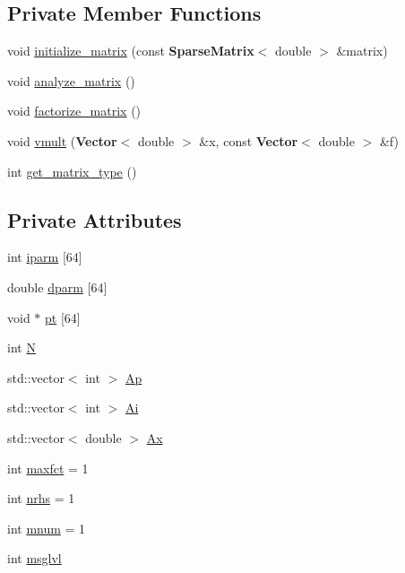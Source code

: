\subsection*{Private Member Functions}
\begin{DoxyCompactItemize}
\item 
void \hyperlink{class_block_solver_wrapper_p_a_r_d_i_s_o_a73460ba651207f3b8e86699f58db896f}{initialize\+\_\+matrix} (const {\bf Sparse\+Matrix}$<$ double $>$ \&matrix)
\item 
void \hyperlink{class_block_solver_wrapper_p_a_r_d_i_s_o_a53ca2b0fda79f7c29ab46b32469d058a}{analyze\+\_\+matrix} ()
\item 
void \hyperlink{class_block_solver_wrapper_p_a_r_d_i_s_o_accbe586b87cfd3d453522fee240ff37b}{factorize\+\_\+matrix} ()
\item 
void \hyperlink{class_block_solver_wrapper_p_a_r_d_i_s_o_a1dfbc3e43736a1225caa0ab91a30b80e}{vmult} ({\bf Vector}$<$ double $>$ \&x, const {\bf Vector}$<$ double $>$ \&f)
\item 
int \hyperlink{class_block_solver_wrapper_p_a_r_d_i_s_o_a3ec780cd305a0fe8326a6acb5c9283e9}{get\+\_\+matrix\+\_\+type} ()
\end{DoxyCompactItemize}
\subsection*{Private Attributes}
\begin{DoxyCompactItemize}
\item 
int \hyperlink{class_block_solver_wrapper_p_a_r_d_i_s_o_a61c49eda443075c200c9583f982ca447}{iparm} \mbox{[}64\mbox{]}
\item 
double \hyperlink{class_block_solver_wrapper_p_a_r_d_i_s_o_aa158c35f9486dc043bf3485da3dec8d4}{dparm} \mbox{[}64\mbox{]}
\item 
void $\ast$ \hyperlink{class_block_solver_wrapper_p_a_r_d_i_s_o_a4d1d5d9882ed7b4019b7412b0bbd125c}{pt} \mbox{[}64\mbox{]}
\item 
int \hyperlink{class_block_solver_wrapper_p_a_r_d_i_s_o_a0218d17deabfb2a7b8905b90ccb6ef46}{N}
\item 
std\+::vector$<$ int $>$ \hyperlink{class_block_solver_wrapper_p_a_r_d_i_s_o_ad284b0a41b7e8f6ab2f58308dfad7c13}{Ap}
\item 
std\+::vector$<$ int $>$ \hyperlink{class_block_solver_wrapper_p_a_r_d_i_s_o_a20249115ffb23d1c0d35c22fa76a1257}{Ai}
\item 
std\+::vector$<$ double $>$ \hyperlink{class_block_solver_wrapper_p_a_r_d_i_s_o_ad32493c27639c20286aea67e702f3442}{Ax}
\item 
int \hyperlink{class_block_solver_wrapper_p_a_r_d_i_s_o_a3d6d894f09dcdeae1295cf5072b79451}{maxfct} = 1
\item 
int \hyperlink{class_block_solver_wrapper_p_a_r_d_i_s_o_a84ae552a3b77bb009366379148119ef8}{nrhs} = 1
\item 
int \hyperlink{class_block_solver_wrapper_p_a_r_d_i_s_o_ae7c0c78a1167861fcce71bc86bddba19}{mnum} = 1
\item 
int \hyperlink{class_block_solver_wrapper_p_a_r_d_i_s_o_a547f7dbd1fa0da9ce546a707d4e19912}{msglvl}
\end{DoxyCompactItemize}


